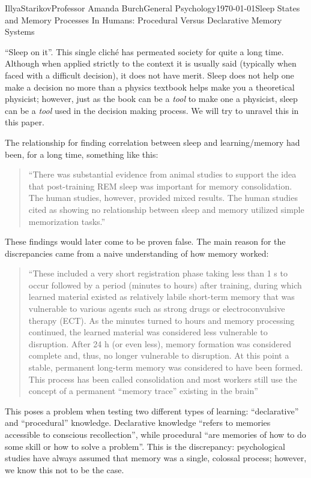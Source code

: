 \documentclass[12pt,letterpaper]{article}
\begin{document}
\begin{mla}{Illya}{Starikov}{Professor Amanda Burch}{General Psychology}{\today}{Sleep States and Memory Processes In Humans: Procedural Versus Declarative Memory Systems}

``Sleep on it''. This single clich\'e has permeated society for quite a long time. Although when applied strictly to the context it is usually said (typically when faced with a difficult decision), it does not have merit. Sleep does not help one make a decision no more than a physics textbook helps make you a theoretical physicist; however, just as the book can be a \textit{tool} to make one a physicist, sleep can be a \textit{tool} used in the decision making process. We will try to unravel this in this paper.

The relationship for finding correlation between sleep and learning/memory had been, for a long time, something like this:

\begin{quotation}
\noindent ``There was substantial evidence from animal studies to support the idea that post-training REM sleep was important for memory consolidation. The human studies, however, provided mixed results. The human studies cited as showing no relationship between sleep and memory utilized simple memorization tasks.''
\end{quotation}

\noindent These findings would later come to be proven false. The main reason for the discrepancies came from a naive understanding of how memory worked:

\begin{quotation}
\noindent ``These included a very short registration phase taking less than 1 s to occur followed by a period (minutes to hours) after training, during which learned material existed as relatively labile short-term memory that was vulnerable to various agents such as strong drugs or electroconvulsive therapy (ECT). As the minutes turned to hours and memory processing continued, the learned material was considered less vulnerable to disruption. After 24 h (or even less), memory formation was considered complete and, thus, no longer vulnerable to disruption. At this point a stable, permanent long-term memory was considered to have been formed. This process has been called consolidation and most workers still use the concept of a permanent “memory trace” existing in the brain''
\end{quotation}

This poses a problem when testing two different types of learning: ``declarative'' and ``procedural'' knowledge. Declarative knowledge ``refers to memories accessible to conscious recollection'', while procedural ``are memories of how to do some skill or how to solve a problem''. This is the discrepancy: psychological studies have always assumed that memory was a single, colossal process; however, we know this not to be the case.


\end{mla}
\end{document}
